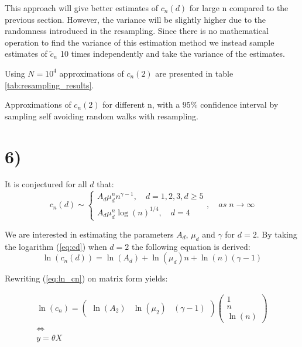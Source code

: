 \documentclass[a4paper]{article}
\begin{document}
This approach will give better estimates of $c_n(d)$ for large n compared to the previous section. However, the variance will be slightly higher due to the randomness introduced in the resampling. Since there is no mathematical operation to find the variance of this estimation method we instead sample estimates of $\tilde{c}_n$ 10 times independently and take the variance of the estimates.

Using $N = 10^4$ approximations of $c_n(2)$ are presented in table \ref{tab:resampling_results}.

\begin{table}[H]
    \centering
    \caption{Approximations of $c_n(2)$ for different n, with a $95\%$ confidence interval by sampling self avoiding random walks with resampling.}
    \label{tab:resampling_results}
    
\end{table}

\section*{6)}

It is conjectured for all $d$ that:
\begin{equation}
    \label{eq:cd}
    c_n(d) \sim 
    \begin{cases}
        A_d\mu_d^nn^{\gamma-1}, \quad d = 1, 2, 3, d \geq 5 \\
        A_d\mu_d^n\log(n)^{1/4}, \quad d = 4
    \end{cases}, \quad as \; n \to \infty
\end{equation}

We are interested in estimating the parameters $A_d$, $\mu_d$ and $\gamma$ for $d = 2$.
By taking the logarithm (\ref{eq:cd}) when $d=2$ the following equation is derived:
\begin{equation}
    \ln(c_n(d)) =  \ln(A_d)+\ln(\mu_d)n+\ln(n)({\gamma-1})
    \label{eq:ln_cn}
\end{equation}

Rewriting (\ref{eq:ln_cn}) on matrix form yields:

\begin{equation}
    \begin{gathered}
        \ln(c_n)=
        \begin{pmatrix}
            \ln(A_2) & \ln(\mu_2) & (\gamma -1)
        \end{pmatrix}
        \begin{pmatrix}
            1 \\
            n \\
            \ln(n)
        \end{pmatrix}
        \\
        \iff
        \\
        y = \theta X
    \end{gathered}
\end{equation}
\end{document}
